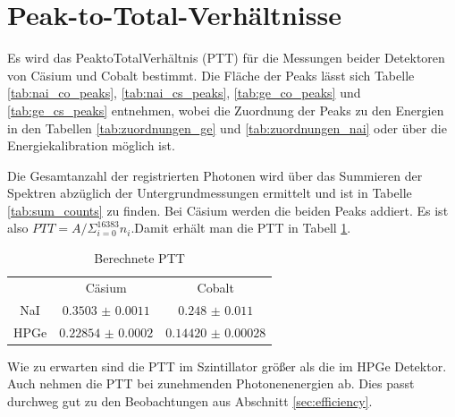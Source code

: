 \section{Peak-to-Total-Verhältnisse}

Es wird das Peak\-to\-Total\-Verhältnis (PTT) für die Messungen beider Detektoren von Cäsium und Cobalt bestimmt. Die Fläche der Peaks lässt sich Tabelle \ref{tab:nai_co_peaks}, \ref{tab:nai_cs_peaks}, \ref{tab:ge_co_peaks} und \ref{tab:ge_cs_peaks} entnehmen, wobei die Zuordnung der Peaks zu den Energien in den Tabellen \ref{tab:zuordnungen_ge} und \ref{tab:zuordnungen_nai} oder über die Energiekalibration möglich ist.

Die Gesamtanzahl der registrierten Photonen wird über das Summieren der Spektren abzüglich der Untergrundmessungen ermittelt und ist in Tabelle \ref{tab:sum_counts} zu finden. Bei Cäsium werden die beiden Peaks addiert. Es ist also $PTT = A / \Sigma_{i=0}^{16383} n_i$.Damit erhält man die PTT in Tabell \ref{tab:ptts}.


\begin{table}[h]
    \centering
    \begin{tabular}{ccc}
	& Cäsium & Cobalt \\
	NaI & $\num{0.3503(11)}$ & $\num{0.248(11)}$\\
	HPGe & $\num{0.22854(20)}$ & $\num{0.14420(28)}$\\
    \end{tabular}
    \caption{Berechnete PTT}
    \label{tab:ptts}
\end{table}


Wie zu erwarten sind die PTT im Szintillator größer als die im HPGe Detektor. Auch nehmen die PTT bei zunehmenden Photonenenergien ab. Dies passt durchweg gut zu den Beobachtungen aus Abschnitt \ref{sec:efficiency}.
